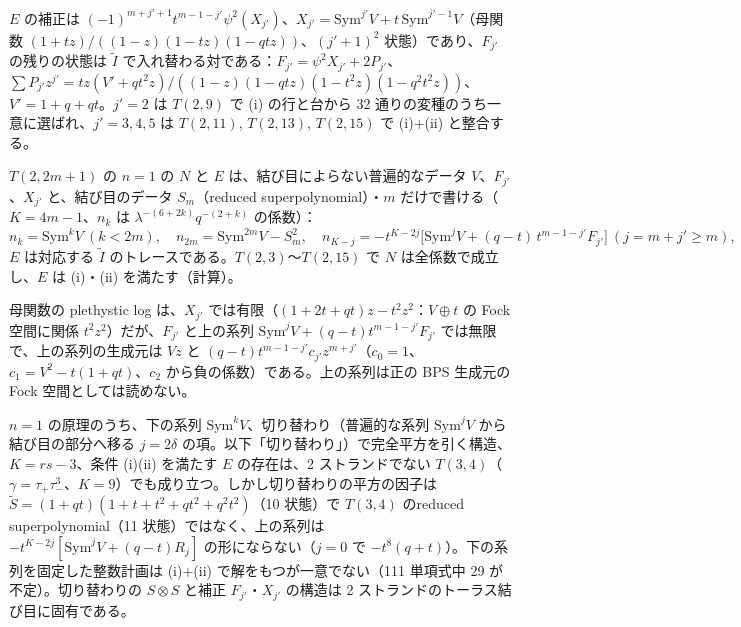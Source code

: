\begin{conjecture}\label{conj:correctionI}
$E$ の補正は $(-1)^{m+j'+1}t^{m-1-j'}\psi^2(X_{j'})$、$X_{j'} = \mathrm{Sym}^{j'}V + t\,\mathrm{Sym}^{j'-1}V$（母関数 $(1+tz)/((1-z)(1-tz)(1-qtz))$、$(j'+1)^2$ 状態）であり、$F_{j'}$ の残りの状態は $\tilde I$ で入れ替わる対である：$F_{j'} = \psi^2 X_{j'} + 2P_{j'}$、$\sum P_{j'}z^{j'} = tz(V' + qt^2z)/((1-z)(1-qtz)(1-t^2z)(1-q^2t^2z))$、$V' = 1 + q + qt$。$j' = 2$ は $T(2,9)$ で (i) の行と台から 32 通りの変種のうち一意に選ばれ、$j' = 3, 4, 5$ は $T(2,11)$, $T(2,13)$, $T(2,15)$ で (i)+(ii) と整合する。
\end{conjecture}
\begin{conjecture}[閉じた式]\label{conj:closedform}
$T(2,2m+1)$ の $n = 1$ の $N$ と $E$ は、結び目によらない普遍的なデータ $V$、$F_{j'}$、$X_{j'}$ と、結び目のデータ $S_m$（reduced superpolynomial）・$m$ だけで書ける（$K = 4m-1$、$n_k$ は $\lambda^{-(6+2k)}q^{-(2+k)}$ の係数）：
\[
 n_k = \mathrm{Sym}^kV\ (k<2m),\quad n_{2m} = \mathrm{Sym}^{2m}V - S_m^2,\quad n_{K-j} = -t^{K-2j}\bigl[\mathrm{Sym}^jV + (q-t)\,t^{m-1-j'}F_{j'}\bigr]\ (j = m+j' \ge m),
\]
$E$ は対応する $\tilde I$ のトレースである。$T(2,3)$〜$T(2,15)$ で $N$ は全係数で成立し、$E$ は (i)・(ii) を満たす（計算）。
\end{conjecture}
\begin{compresult}\label{cr:plog}
母関数の plethystic log は、$X_{j'}$ では有限（$(1+2t+qt)z - t^2z^2$：$V\oplus t$ の Fock 空間に関係 $t^2z^2$）だが、$F_{j'}$ と上の系列 $\mathrm{Sym}^jV + (q-t)t^{m-1-j'}F_{j'}$ では無限で、上の系列の生成元は $Vz$ と $(q-t)t^{m-1-j'}c_{j'}z^{m+j'}$（$c_0 = 1$、$c_1 = V^2 - t(1+qt)$、$c_2$ から負の係数）である。上の系列は正の BPS 生成元の Fock 空間としては読めない。
\end{compresult}
\begin{compresult}\label{cr:t34}
$n = 1$ の原理のうち、下の系列 $\mathrm{Sym}^kV$、切り替わり（普遍的な系列 $\mathrm{Sym}^jV$ から結び目の部分へ移る $j = 2\delta$ の項。以下「切り替わり」）で完全平方を引く構造、$K = rs - 3$、条件 (i)(ii) を満たす $E$ の存在は、2 ストランドでない $T(3,4)$（$\gamma = \tau_+\tau_-^3$、$K = 9$）でも成り立つ。しかし切り替わりの平方の因子は $\tilde S = (1+qt)(1+t+t^2+qt^2+q^2t^2)$（10 状態）で $T(3,4)$ のreduced superpolynomial（11 状態）ではなく、上の系列は $-t^{K-2j}[\mathrm{Sym}^jV + (q-t)R_j]$ の形にならない（$j = 0$ で $-t^8(q+t)$）。下の系列を固定した整数計画は (i)+(ii) で解をもつが一意でない（111 単項式中 29 が不定）。切り替わりの $S\otimes S$ と補正 $F_{j'}$・$X_{j'}$ の構造は 2 ストランドのトーラス結び目に固有である。
\end{compresult}
